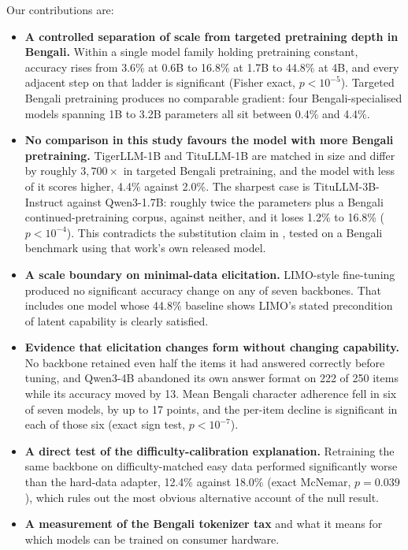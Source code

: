\documentclass[10pt,twocolumn,letterpaper]{article}
\begin{document}
Our contributions are:

\begin{itemize}
  \item \textbf{A controlled separation of scale from targeted pretraining
        depth in Bengali.} Within a single model family holding pretraining
        constant, accuracy rises from 3.6\% at 0.6B to 16.8\% at 1.7B to 44.8\%
        at 4B, and every adjacent step on that ladder is significant (Fisher
        exact, $p < 10^{-5}$). Targeted Bengali pretraining produces no
        comparable gradient: four Bengali-specialised models spanning 1B to
        3.2B parameters all sit between 0.4\% and 4.4\%.
  \item \textbf{No comparison in this study favours the model with more
        Bengali pretraining.} TigerLLM-1B and TituLLM-1B are matched in size
        and differ by roughly $3{,}700\times$ in targeted Bengali pretraining,
        and the model with less of it scores higher, 4.4\% against 2.0\%. The
        sharpest case is TituLLM-3B-Instruct against Qwen3-1.7B: roughly twice
        the parameters plus a Bengali continued-pretraining corpus, against
        neither, and it loses 1.2\% to 16.8\% ($p < 10^{-4}$). This contradicts
        the substitution claim in \parencite{raihan2025tigerllm}, tested on a
        Bengali benchmark using that work's own released model.
  \item \textbf{A scale boundary on minimal-data elicitation.} LIMO-style
        fine-tuning produced no significant accuracy change on any of seven
        backbones. That includes one model whose 44.8\% baseline shows LIMO's
        stated precondition of latent capability is clearly satisfied.
  \item \textbf{Evidence that elicitation changes form without changing
        capability.} No backbone retained even half the items it had answered
        correctly before tuning, and Qwen3-4B abandoned its own answer format
        on 222 of 250 items while its accuracy moved by 13. Mean Bengali
        character adherence fell in six of seven models, by up to 17 points,
        and the per-item decline is significant in each of those six (exact
        sign test, $p < 10^{-7}$).
  \item \textbf{A direct test of the difficulty-calibration explanation.}
        Retraining the same backbone on difficulty-matched easy data performed
        significantly worse than the hard-data adapter, 12.4\% against 18.0\%
        (exact McNemar, $p = 0.039$), which rules out the most obvious
        alternative account of the null result.
  \item \textbf{A measurement of the Bengali tokenizer tax} and what it means
        for which models can be trained on consumer hardware.
\end{itemize}
\end{document}

